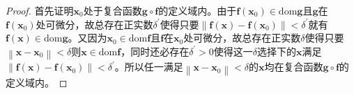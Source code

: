 \documentclass[../main.tex]{subfiles}
\begin{document}
\begin{proof}
    首先证明$\mathbf{x}_0$处于复合函数$\mathbf{g}\circ\mathbf{f}$的定义域内。由于$\mathbf{f}\left(\mathbf{x}_0\right)\in\mathrm{dom}\mathbf{g}$且$\mathbf{g}$在$\mathbf{f}\left(\mathbf{x}_0\right)$处可微分，故总存在正实数$\delta^\prime$使得只要$\left\|\mathbf{f}\left(\mathbf{x}\right)-\mathbf{f}\left(\mathbf{x}_0\right)\right\|<\delta^\prime$就有$\mathbf{f}\left(\mathbf{x}\right)\in\mathrm{dom}\mathbf{g}$。又因为$\mathbf{x}_0\in\mathrm{dom}\mathbf{f}$且$\mathbf{f}$在$\mathbf{x}_0$处可微分，故总存在正实数$\delta$使得只要$\left\|\mathbf{x}-\mathbf{x}_0\right\|<\delta$则$\mathbf{x}\in\mathrm{dom}\mathbf{f}$，同时还必存在$\delta^\prime>0$使得这一$\delta$选择下的$\mathbf{x}$满足$\left\|\mathbf{f}\left(\mathbf{x}\right)-\mathbf{f}\left(\mathbf{x}_0\right)\right\|<\delta^\prime$。所以任一满足$\left\|\mathbf{x}-\mathbf{x}_0\right\|<\delta$的$\mathbf{x}$均在复合函数$\mathbf{g}\circ\mathbf{f}$的定义域内。


\end{proof}
\end{document}

